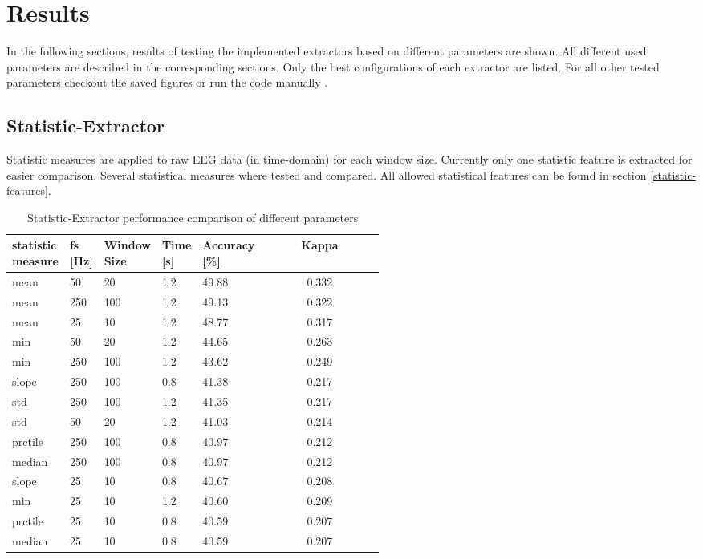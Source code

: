 \documentclass{article}
\begin{document}
\section{Results}
In the following sections, results of testing the implemented extractors based on different parameters are shown. All different used parameters are described in the corresponding sections. Only the best configurations of each extractor are listed. For all other tested parameters checkout the saved figures or run the code manually \parencite{Steinwender_Research_Figures_2022}.

\subsection{Statistic-Extractor}
Statistic measures are applied to raw EEG data (in time-domain) for each window size. Currently only one statistic feature is extracted for easier comparison. Several statistical measures where tested and compared. All allowed statistical features can be found in section \ref{statistic-features}.

\begin{table}[H]
 \centering
 \begin{tabular}{|C{0.15\linewidth}|C{0.05\linewidth}|C{0.12\linewidth}|C{0.08\linewidth}|C{0.14\linewidth}|c|}
 \hline
   \textbf{statistic measure}  & \textbf{fs [Hz]} & \centering\textbf{Window Size} & \textbf{Time [s]} & \textbf{Accuracy [\%]} & \textbf{Kappa} \\\hline
   mean    & 50  & 20  & 1.2 & 49.88 & 0.332 \\
   mean    & 250 & 100 & 1.2 & 49.13 & 0.322 \\
   mean    & 25  & 10  & 1.2 & 48.77 & 0.317 \\
   min     & 50  & 20  & 1.2 & 44.65 & 0.263 \\
   min     & 250 & 100 & 1.2 & 43.62 & 0.249 \\
   slope   & 250 & 100 & 0.8 & 41.38 & 0.217 \\
   std     & 250 & 100 & 1.2 & 41.35 & 0.217 \\
   std     & 50  & 20  & 1.2 & 41.03 & 0.214 \\
   prctile & 250 & 100 & 0.8 & 40.97 & 0.212 \\
   median  & 250 & 100 & 0.8 & 40.97 & 0.212 \\
   slope   & 25  & 10  & 0.8 & 40.67 & 0.208 \\
   min     & 25  & 10  & 1.2 & 40.60 & 0.209 \\
   prctile & 25  & 10  & 0.8 & 40.59 & 0.207 \\
   median  & 25  & 10  & 0.8 & 40.59 & 0.207 \\\hline
 \end{tabular}
 \caption{Statistic-Extractor performance comparison of different parameters}
 \label{tbl:statistic-feature-comparison-table}
\end{table}
\end{document}
